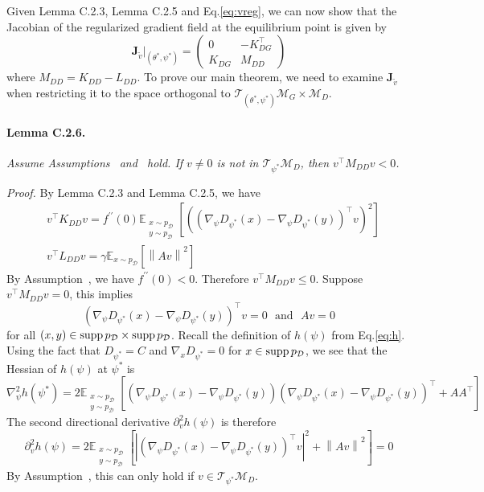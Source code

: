 Given Lemma C.2.3, Lemma C.2.5 and Eq.\ref{eq:vreg}, we can now show that the Jacobian of the regularized gradient field at the equilibrium point is given by
\begin{equation}
\textbf{J}_{\tilde{v}}\biggr\vert_{(\theta^*,\psi^*)}=\begin{pmatrix}
0 & -K_{DG}^\top\\ 
K_{DG} & M_{DD}
\end{pmatrix}
\end{equation}
where $M_{DD}=K_{DD}-L_{DD}$. To prove our main theorem, we need to examine $\textbf{J}_{\tilde{v}}$ when restricting it to the space orthogonal to $\mathcal{T}_{(\theta^*,\psi^*)}\mathcal{M}_G\times\mathcal{M}_D$.

\paragraph{Lemma C.2.6.} \emph{Assume Assumptions~ and~ hold. If $v\neq0$ is not in $\mathcal{T}_{\psi^*}\mathcal{M}_D$, then $v^\top M_{DD}v<0$.}

\emph{Proof.} By Lemma C.2.3 and Lemma C.2.5, we have
\begin{align}
&v^\top K_{DD}v=f^{\prime\prime}(0)\mathbb{E}_{\substack{x\sim p_\mathcal{D}\\y\sim p_\mathcal{D}}}\left[((\nabla_\psi D_{\psi^*}(x)-\nabla_\psi D_{\psi^*}(y))^\top v)^2\right] \\
&v^\top L_{DD}v=\gamma\mathbb{E}_{x\sim p_\mathcal{D}}\left[\left\|Av\right \|^2\right]
\end{align}
By Assumption~, we have $f^{\prime\prime}(0)<0$. Therefore $v^\top M_{DD}v\leq0$. Suppose $v^\top M_{DD}v=0$, this implies
\begin{equation}
(\nabla_\psi D_{\psi^*}(x)-\nabla_\psi D_{\psi^*}(y))^\top v=0\,\,\,\,\text{and}\,\,\,\,Av=0
\end{equation}
for all $(x,y)\in\operatorname{supp} p_\mathcal{D}\times\operatorname{supp} p_\mathcal{D}$. Recall the definition of $h(\psi)$ from Eq.\ref{eq:h}. Using the fact that $D_{\psi^*}=C$ and $\nabla_x D_{\psi^*}=0$ for $x\in\operatorname{supp} p_\mathcal{D}$, we see that the Hessian of $h(\psi)$ at $\psi^*$ is
\begin{equation}
\nabla^2_\psi h(\psi^*)=2\mathbb{E}_{\substack{x\sim p_\mathcal{D}\\y\sim p_\mathcal{D}}}[(\nabla_\psi D_{\psi^*}(x)-\nabla_\psi D_{\psi^*}(y))(\nabla_\psi D_{\psi^*}(x)-\nabla_\psi D_{\psi^*}(y))^\top+AA^\top]
\end{equation}
The second directional derivative $\partial^2_v h(\psi)$ is therefore
\begin{equation}
\partial^2_v h(\psi)=2\mathbb{E}_{\substack{x\sim p_\mathcal{D}\\y\sim p_\mathcal{D}}}\left[\left| (\nabla_\psi D_{\psi^*}(x)-\nabla_\psi D_{\psi^*}(y))^\top v\right|^2 + \left\|Av\right\|^2\right]=0
\end{equation}
By Assumption~, this can only hold if $v\in\mathcal{T}_{\psi^*}\mathcal{M}_D$.

